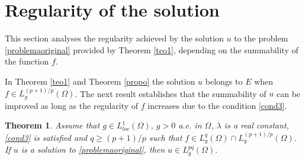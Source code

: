\documentclass[preprint,12pt]{elsarticle}
\newtheorem{theorem}{Theorem}[section]
\begin{document}
		\section{Regularity of the solution}
		This section analyses the regularity achieved by the solution $u$ to the problem \eqref{problemaoriginal} provided by Theorem \ref{teo1}, depending on the summability of the function $f$.\par 
		In Theorem \ref{teo1} and Theorem \ref{propo} the solution $u$ belongs to $E$ when ${f\in L^{(p+1)/p}_g(\Omega)}$. The next result establishes that the summability of $u$ can be improved as long as the regularity of $f$ increases due to the condition \eqref{cond3}.
		\begin{theorem} \label{teoreg}
			Assume that $g\in L^1_{loc}(\Omega)$, $g>0$ a.e. in $\Omega$, $\lambda$ is a real constant, \eqref{cond3} is satisfied and $q\geq (p+1)/p$ such that $f\in L^q_g(\Omega)\cap L^{(p+1)/p}_g(\Omega)$.	If $u$ is a solution to \eqref{problemaoriginal}, then $u\in L^{p q}_g(\Omega)$.
		\end{theorem}
		
\end{document}
